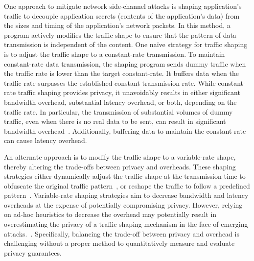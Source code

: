 One approach to mitigate network side-channel attacks is shaping application's traffic to decouple application secrets (\ie contents of the application's data) from the sizes and timing of the application's network packets.
In this method, a program actively modifies the traffic shape to ensure that the pattern of data transmission is independent of the content.  
One na\"ive strategy for traffic shaping is to adjust the traffic shape to a constant-rate transmission.
To maintain constant-rate data transmission, the shaping program sends dummy traffic when the traffic rate is lower than the target constant-rate. 
It buffers data when the traffic rate surpasses the established constant transmission rate.
While constant-rate traffic shaping provides privacy, it unavoidably results in either significant bandwidth overhead, substantial latency overhead, or both, depending on the traffic rate.
In particular, the transmission of substantial volumes of dummy traffic, even when there is no real data to be sent, can result in significant bandwidth overhead~\cite{saponas2007devices}.
Additionally, buffering data to maintain the constant rate can cause latency overhead.


An alternate approach is to modify the traffic shape to a variable-rate shape, thereby altering the trade-offs between privacy and overheads.
These shaping strategies either dynamically adjust the traffic shape at the transmission time to obfuscate the original traffic pattern~\cite{cai2014csbuflo, juarez2016wtfpad}, or reshape the traffic to follow a predefined pattern~\cite{wright2009traffic,wang2017walkie}.
Variable-rate shaping strategies aim to decrease bandwidth and latency overheads at the expense of potentially compromising privacy.
However, relying on ad-hoc heuristics to decrease the overhead may potentially result in overestimating the privacy of a traffic shaping mechanism in the face of emerging attacks.~\cite{sirinam2018df}. 
Specifically, balancing  the trade-off between privacy and overhead is challenging without a proper method to quantitatively measure and evaluate privacy guarantees. 


